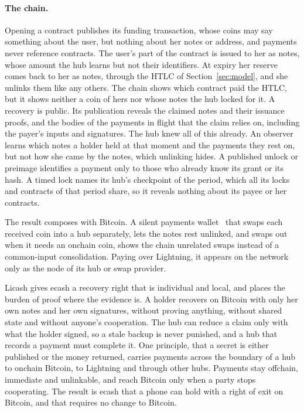 \documentclass[11pt]{article}
\makeatletter
\renewcommand\section{\@startsection{section}{1}{\z@}{-2.5ex plus -1ex minus -.2ex}{1.2ex plus .2ex}{\large\bfseries}}
\makeatother
\begin{document}
\paragraph{The chain.} Opening a contract publishes its funding transaction, whose coins may say something about the user, but nothing about her notes or address, and payments never reference contracts. The user's part of the contract is issued to her as notes, whose amount the hub learns but not their identifiers. At expiry her reserve comes back to her as notes, through the HTLC of Section~\ref{sec:model}, and she unlinks them like any others. The chain shows which contract paid the HTLC, but it shows neither a coin of hers nor whose notes the hub locked for it. A recovery is public. Its publication reveals the claimed notes and their issuance proofs, and the bodies of the payments in flight that the claim relies on, including the payer's inputs and signatures. The hub knew all of this already. An observer learns which notes a holder held at that moment and the payments they rest on, but not how she came by the notes, which unlinking hides. A published unlock or preimage identifies a payment only to those who already know its grant or its hash. A timed lock names its hub's checkpoint of the period, which all its locks and contracts of that period share, so it reveals nothing about its payee or her contracts.

The result composes with Bitcoin. A silent payments wallet~\cite{bip352} that swaps each received coin into a hub separately, lets the notes rest unlinked, and swaps out when it needs an onchain coin, shows the chain unrelated swaps instead of a common-input consolidation. Paying over Lightning, it appears on the network only as the node of its hub or swap provider.

\section{Conclusion}
\label{sec:conclusion}

Licash gives ecash a recovery right that is individual and local, and places the burden of proof where the evidence is. A holder recovers on Bitcoin with only her own notes and her own signatures, without proving anything, without shared state and without anyone's cooperation. The hub can reduce a claim only with what the holder signed, so a stale backup is never punished, and a hub that records a payment must complete it. One principle, that a secret is either published or the money returned, carries payments across the boundary of a hub to onchain Bitcoin, to Lightning and through other hubs. Payments stay offchain, immediate and unlinkable, and reach Bitcoin only when a party stops cooperating. The result is ecash that a phone can hold with a right of exit on Bitcoin, and that requires no change to Bitcoin.
\end{document}
